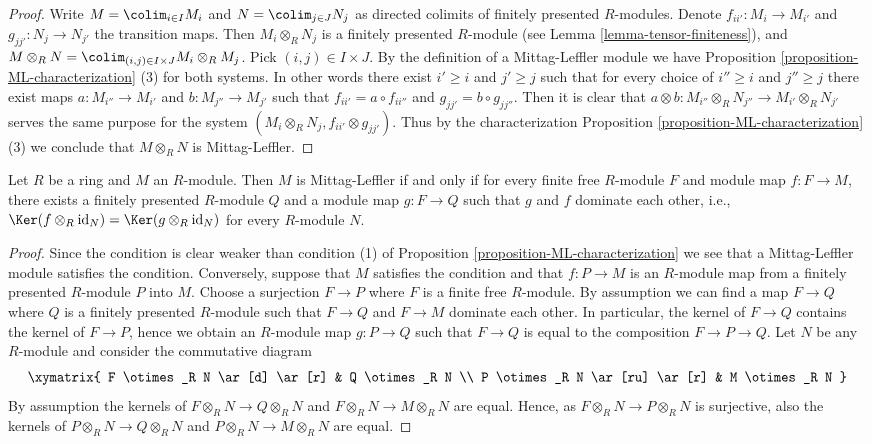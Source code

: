 \begin{proof}
Write $M = \colim_{i \in I} M_i$ and $N = \colim_{j \in J} N_j$
as directed colimits of finitely presented $R$-modules.
Denote $f_{ii'} : M_i \to M_{i'}$ and $g_{jj'} : N_j \to N_{j'}$ the
transition maps. Then $M_i \otimes_R N_j$ is a finitely presented
$R$-module (see
Lemma \ref{lemma-tensor-finiteness}),
and $M \otimes_R N = \colim_{(i, j) \in I \times J} M_i \otimes_R M_j$.
Pick $(i, j) \in I \times J$. By the definition of a Mittag-Leffler module
we have
Proposition \ref{proposition-ML-characterization} (3)
for both systems. In other words there exist $i' \geq i$ and $j' \geq j$
such that for every choice of $i'' \geq i$ and $j'' \geq j$ there exist
maps $a : M_{i''} \to M_{i'}$ and $b : M_{j''} \to M_{j'}$ such that
$f_{ii'} = a \circ f_{ii''}$ and $g_{jj'} = b \circ g_{jj''}$.
Then it is clear that
$a \otimes b : M_{i''} \otimes_R N_{j''} \to M_{i'} \otimes_R N_{j'}$
serves the same purpose for the system
$(M_i \otimes_R N_j, f_{ii'} \otimes g_{jj'})$.
Thus by the characterization
Proposition \ref{proposition-ML-characterization} (3)
we conclude that $M \otimes_R N$ is Mittag-Leffler.
\end{proof}

\begin{lemma}
\label{lemma-ML-also}
Let $R$ be a ring and $M$ an $R$-module. Then $M$ is Mittag-Leffler if and
only if for every finite free $R$-module $F$ and module map
$f: F \to M$, there exists a finitely presented $R$-module $Q$
and a module map $g : F \to Q$ such that $g$ and $f$ dominate each other, i.e.,
$\Ker(f \otimes_R \text{id}_N) = \Ker(g \otimes_R \text{id}_N)$
for every $R$-module $N$.
\end{lemma}

\begin{proof}
Since the condition is clear weaker than condition (1) of
Proposition \ref{proposition-ML-characterization}
we see that a Mittag-Leffler module satisfies the condition.
Conversely, suppose that $M$ satisfies the condition and that
$f : P \to M$ is an $R$-module map from a finitely presented
$R$-module $P$ into $M$. Choose a surjection $F \to P$ where
$F$ is a finite free $R$-module. By assumption we can find a map
$F \to Q$ where $Q$ is a finitely presented $R$-module such that
$F \to Q$ and $F \to M$ dominate each other. In particular, the kernel
of $F \to Q$ contains the kernel of $F \to P$, hence we obtain an
$R$-module map $g : P \to Q$ such that $F \to Q$ is equal to
the composition $F \to P \to Q$. Let $N$ be any $R$-module and
consider the commutative diagram
$$
\xymatrix{
F \otimes_R N \ar[d] \ar[r] & Q \otimes_R N \\
P \otimes_R N \ar[ru] \ar[r] & M \otimes_R N
}
$$
By assumption the kernels of $F \otimes_R N \to Q \otimes_R N$
and $F \otimes_R N \to M \otimes_R N$ are equal. Hence, as
$F \otimes_R N \to P \otimes_R N$ is surjective, also the kernels
of $P \otimes_R N \to Q \otimes_R N$
and $P \otimes_R N \to M \otimes_R N$ are equal.
\end{proof}

